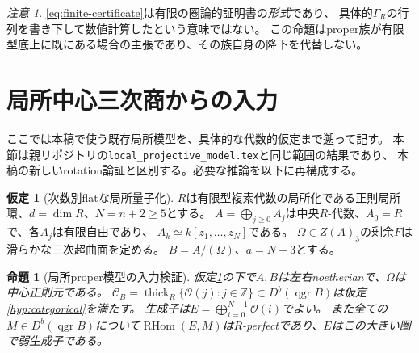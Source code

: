 \documentclass[a4paper,10pt]{ltjsarticle}
\newtheorem{proposition}[theorem]{命題}
\theoremstyle{definition}
\newtheorem{hypothesis}[theorem]{仮定}
\theoremstyle{remark}
\newtheorem{remark}[theorem]{注意}
\newcommand{\RHom}{\operatorname{RHom}}
\newcommand{\thick}{\operatorname{thick}}
\newcommand{\qgr}{\operatorname{qgr}}
\newcommand{\OO}{\mathcal O}
\newcommand{\cC}{\mathcal C}
\begin{document}
\begin{remark}
\eqref{eq:finite-certificate}は有限の圏論的証明書の\emph{形式}であり、
具体的$\Gamma_R$の行列を書き下して数値計算したという意味ではない。
この命題はproper族が有限型底上に既にある場合の主張であり、その族自身の降下を代替しない。
\end{remark}

\section{局所中心三次商からの入力}\label{sec:projective}
ここでは本稿で使う既存局所模型を、具体的な代数的仮定まで遡って記す。
本節は親リポジトリ\cite{Repo}の\texttt{local\_projective\_model.tex}と同じ範囲の結果であり、
本稿の新しいrotation論証と区別する。必要な推論を以下に再構成する。

\begin{hypothesis}[次数別flatな局所量子化]\label{hyp:algebra}
$R$は有限型複素代数の局所化である正則局所環、$d=\dim R$、$N=n+2\ge5$とする。
$A=\bigoplus_{j\ge0}A_j$は中央$R$-代数、$A_0=R$で、各$A_j$は有限自由であり、
$A_k\simeq k[z_1,\ldots,z_N]$である。
$\Omega\in Z(A)_3$の剰余$F$は滑らかな三次超曲面を定める。
$B=A/(\Omega)$、$a=N-3$とする。
\end{hypothesis}

\begin{proposition}[局所proper模型の入力検証]\label{prop:local-model}
仮定\ref{hyp:algebra}の下で$A,B$は左右noetherianで、$\Omega$は中心正則元である。
$\cC_B=\thick_R\{\OO(j):j\in\mathbb Z\}\subset D^b(\qgr B)$は仮定\ref{hyp:categorical}を満たす。
生成子は$E=\bigoplus_{i=0}^{N-1}\OO(i)$でよい。
また全ての$M\in D^b(\qgr B)$について$\RHom(E,M)$は$R$-perfectであり、$E$はこの大きい圏で弱生成子である。
\end{proposition}
\end{document}
